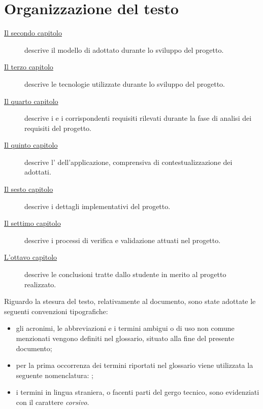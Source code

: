 \section{Organizzazione del testo}

\begin{description}
    \item[{\hyperref[cap:processi-metodologie]{Il secondo capitolo}}] descrive il modello di  adottato durante lo sviluppo del progetto.
    
    \item[{\hyperref[background]{Il terzo capitolo}}] descrive le tecnologie utilizzate durante lo sviluppo del progetto.
    
    \item[{\hyperref[cap:analisi-requisiti]{Il quarto capitolo}}] descrive i  e i corrispondenti requisiti rilevati durante la fase di analisi dei requisiti del progetto.
    
    \item[{\hyperref[cap:progettazione-codifica]{Il quinto capitolo}}] descrive l' dell'applicazione, comprensiva di contestualizzazione dei  adottati.
    
    \item[{\hyperref[codifica]{Il sesto capitolo}}] descrive i dettagli implementativi del progetto.
    
    \item[{\hyperref[cap:verifica-validazione]{Il settimo capitolo}}] descrive i processi di verifica e validazione attuati nel progetto.
    
    \item[{\hyperref[cap:conclusioni]{L'ottavo capitolo}}] descrive le conclusioni tratte dallo studente in merito al progetto realizzato.
\end{description}

Riguardo la stesura del testo, relativamente al documento, sono state adottate le seguenti convenzioni tipografiche:
\begin{itemize}
	\item gli acronimi, le abbreviazioni e i termini ambigui o di uso non comune menzionati vengono definiti nel glossario, situato alla fine del presente documento;
	\item per la prima occorrenza dei termini riportati nel glossario viene utilizzata la seguente nomenclatura: ;
	\item i termini in lingua straniera, o facenti parti del gergo tecnico, sono evidenziati con il carattere \emph{corsivo}.
\end{itemize}